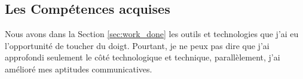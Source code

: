\subsection{Les Compétences acquises}
Nous avons dans la Section \ref{sec:work_done} les outils et technologies que j'ai eu l'opportunité de toucher du doigt.
Pourtant, je ne peux pas dire que j'ai approfondi seulement le côté technologique et technique, parallèlement, j'ai amélioré mes aptitudes communicatives.
